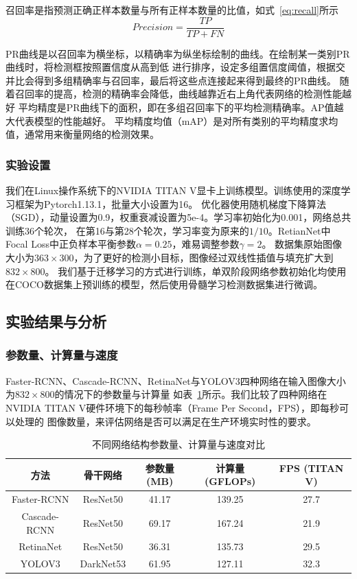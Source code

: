 召回率是指预测正确正样本数量与所有正样本数量的比值，如式~\ref{eq:recall}所示
\begin{equation}               
  Precision = \frac{TP}{TP + FN}
  \label{eq:recall}     
\end{equation} 

PR曲线是以召回率为横坐标，以精确率为纵坐标绘制的曲线。在绘制某一类别PR曲线时，将检测框按照置信度从高到低
进行排序，设定多组置信度阈值，根据交并比会得到多组精确率与召回率，最后将这些点连接起来得到最终的PR曲线。
随着召回率的提高，检测的精确率会降低，曲线越靠近右上角代表网络的检测性能越好
平均精度是PR曲线下的面积，即在多组召回率下的平均检测精确率。AP值越大代表模型的性能越好。
平均精度均值（mAP）是对所有类别的平均精度求均值，通常用来衡量网络的检测效果。

\subsubsection{实验设置}
我们在Linux操作系统下的NVIDIA TITAN V显卡上训练模型。训练使用的深度学习框架为Pytorch1.13.1，批量大小设置为16。
优化器使用随机梯度下降算法（SGD），动量设置为0.9，权重衰减设置为5e-4。学习率初始化为0.001，网络总共训练36个轮次，
在第16与第28个轮次，学习率变为原来的$1/10$。RetianNet中Focal Loss中正负样本平衡参数$\alpha=0.25$，难易调整参数$\gamma=2$。
数据集原始图像大小为$363 \times 300$，为了更好的检测小目标，图像经过双线性插值与填充扩大到$832 \times 800$。
我们基于迁移学习的方式进行训练，单双阶段网络参数初始化均使用在COCO数据集上预训练的模型，然后使用骨髓学习检测数据集进行微调。

\subsection{实验结果与分析}
\subsubsection{参数量、计算量与速度}

Faster-RCNN、Cascade-RCNN、RetinaNet与YOLOV3四种网络在输入图像大小为$832 \times 800$的情况下的参数量与计算量
如表~\ref{table:cell_Network}所示。我们比较了四种网络在NVIDIA TITAN V硬件环境下的每秒帧率（Frame Per Second，FPS），即每秒可以处理的
图像数量，来评估网络是否可以满足在生产环境实时性的要求。

\begin{table}[htbp]
  \caption{不同网络结构参数量、计算量与速度对比}   
  \centering 
  \label{table:cell_Network}
  \begin{tabular}{ccccc}
    \toprule[2pt]
    方法 & 骨干网络  & 参数量(MB) & 计算量(GFLOPs) & FPS (TITAN V) \\
    \midrule[1.5pt] 
    Faster-RCNN & ResNet50 &  41.17 & 139.25 & 27.7 \\ 
    Cascade-RCNN & ResNet50 & 69.17 & 167.24 & 21.9   \\ 
    RetinaNet & ResNet50 & 36.31 & 135.73 & 29.5   \\ 
    YOLOV3 & DarkNet53 & 61.95 & 127.11 & 32.3  \\ 
    \bottomrule[2pt]      
  \end{tabular} 
\end{table}

